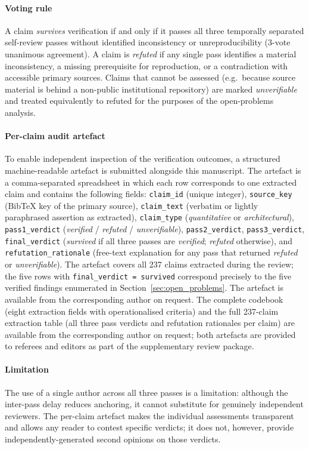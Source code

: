 \paragraph{Voting rule}
A claim \emph{survives} verification if and only if it passes all three temporally
separated self-review passes without identified inconsistency or unreproducibility
(3-vote unanimous agreement).
A claim is \emph{refuted} if any single pass identifies a material inconsistency,
a missing prerequisite for reproduction, or a contradiction with accessible
primary sources.
Claims that cannot be assessed (e.g.\ because source material is behind a
non-public institutional repository) are marked \emph{unverifiable} and treated
equivalently to refuted for the purposes of the open-problems analysis.

\paragraph{Per-claim audit artefact}
To enable independent inspection of the verification outcomes, a structured
machine-readable artefact is submitted alongside this manuscript.
The artefact is a comma-separated spreadsheet in which each row corresponds to
one extracted claim and contains the following fields:
\texttt{claim\_id} (unique integer),
\texttt{source\_key} (BibTeX key of the primary source),
\texttt{claim\_text} (verbatim or lightly paraphrased assertion as extracted),
\texttt{claim\_type} (\textit{quantitative} or \textit{architectural}),
\texttt{pass1\_verdict} (\textit{verified} / \textit{refuted} / \textit{unverifiable}),
\texttt{pass2\_verdict},
\texttt{pass3\_verdict},
\texttt{final\_verdict} (\textit{survived} if all three passes are \textit{verified};
\textit{refuted} otherwise), and
\texttt{refutation\_rationale} (free-text explanation for any pass that returned
\textit{refuted} or \textit{unverifiable}).
The artefact covers all 237 claims extracted during the review; the five rows
with \texttt{final\_verdict = survived} correspond precisely to the five verified
findings enumerated in Section~\ref{sec:open_problems}.
The artefact is available from the corresponding author on request.
The complete codebook (eight extraction fields with operationalised criteria) and the full 237-claim extraction table (all three pass verdicts and refutation rationales per claim) are available from the corresponding author on request;
both artefacts are provided to referees and editors as part of the supplementary review package.

\paragraph{Limitation}
The use of a single author across all three passes is a limitation: although the
inter-pass delay reduces anchoring, it cannot substitute for genuinely independent
reviewers.
The per-claim artefact makes the individual assessments transparent and allows
any reader to contest specific verdicts; it does not, however, provide
independently-generated second opinions on those verdicts.

